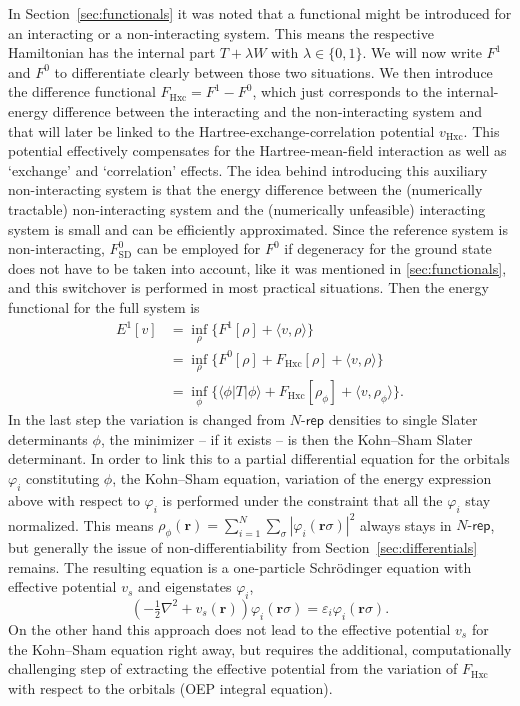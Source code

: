 \documentclass[journal=apcach,manuscript=article,layout=twocolumn]{achemso}
\newcommand{\vHxc}{v_\mathrm{Hxc}}
\newcommand{\FSD}{F^0_\mathrm{SD}}
\newcommand{\FHxc}{F_\mathrm{Hxc}}
\newcommand{\rr}{\mathbf{r}}
\newcommand{\Nrep}{\ensuremath{N\text{-}\mathsf{rep}}}
\begin{document}
In Section~\ref{sec:functionals} it was noted that a functional might be introduced for an interacting or a non-interacting system. This means the respective Hamiltonian has the internal part $T + \lambda W$ with $\lambda \in \{0,1\}$. We will now write $F^1$ and $F^0$ to differentiate clearly between those two situations.
We then introduce the difference functional $\FHxc = F^1-F^0$, which just corresponds to the internal-energy difference between the interacting and the non-interacting system and that will later be linked to the Hartree-exchange-correlation potential $\vHxc$. This potential effectively compensates for the Hartree-mean-field interaction as well as `exchange' and `correlation' effects. The idea behind introducing this auxiliary non-interacting system is that the energy difference between the (numerically tractable) non-interacting system and the (numerically unfeasible) interacting system is small and can be efficiently approximated.
Since the reference system is non-interacting, $\FSD$ can be employed for $F^0$ if degeneracy for the ground state does not have to be taken into account, like it was mentioned in \ref{sec:functionals}, and this switchover is performed in most practical situations. Then the energy functional for the full system is
\begin{equation*}
\begin{aligned}
    E^1[v] &= \inf_\rho \{ F^1[\rho] + \langle v,\rho \rangle \} \\
    &= \inf_\rho \{ F^0[\rho] + \FHxc[\rho] + \langle v,\rho \rangle \} \\
    &= \inf_\phi \{ \langle \phi| T |\phi \rangle + \FHxc[\rho_\phi] + \langle v,\rho_\phi \rangle\}.
\end{aligned}
\end{equation*}
%
In the last step the variation is changed from $\Nrep$ densities to single Slater determinants $\phi$, the minimizer -- if it exists -- is then the Kohn--Sham Slater determinant. In order to link this to a partial differential equation for the orbitals $\varphi_i$ constituting $\phi$, the Kohn--Sham equation, variation of the energy expression above with respect to $\varphi_i$ is performed under the constraint that all the $\varphi_i$ stay normalized. This means $\rho_\phi(\rr) = \sum_{i=1}^N \sum_\sigma |\varphi_i(\rr\sigma)|^2$ always stays in $\Nrep$, but generally the issue of non-differentiability from Section~\ref{sec:differentials} remains. The resulting equation is a one-particle Schr\"odinger equation with effective potential $v_s$ and eigenstates $\varphi_i$,
\begin{equation}\label{eq:KS}
    \left( -\tfrac{1}{2}\nabla^2 + v_s(\rr)\right) \varphi_i(\rr\sigma) = \varepsilon_i \varphi_i(\rr\sigma).
\end{equation}
On the other hand this approach does not lead to the effective potential $v_s$ for the Kohn--Sham equation right away, but requires the additional, computationally challenging step of extracting the effective potential from the variation of $\FHxc$ with respect to the orbitals (OEP integral equation\cite{kummel2003optimized}).
\end{document}
